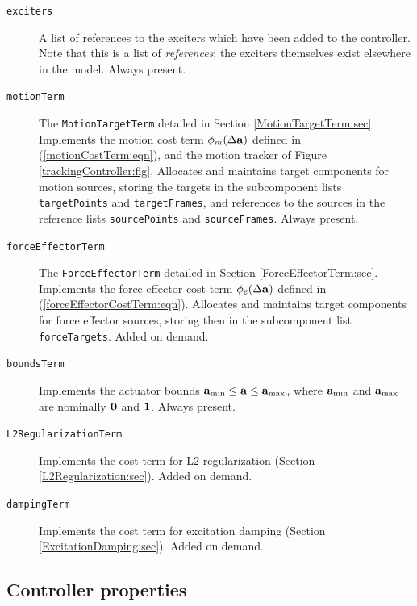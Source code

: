 \begin{description}

\item[\tt exciters]\mbox{}

A list of references to the exciters which have been added to the controller.
Note that this is a list of {\it references}; the exciters themselves exist
elsewhere in the model. Always present.

\item[\tt motionTerm]\mbox{}

The {\tt MotionTargetTerm} detailed in Section \ref{MotionTargetTerm:sec}.
Implements the motion cost term $\phi_m(\Delta{\bf a})$ defined in
(\ref{motionCostTerm:eqn}), and the motion tracker of
Figure \ref{trackingController:fig}.  Allocates and maintains target components
for motion sources, storing the targets in the subcomponent lists {\tt
targetPoints} and {\tt targetFrames}, and references to the sources in the
reference lists {\tt sourcePoints} and {\tt sourceFrames}. Always present.

\item[\tt forceEffectorTerm]\mbox{}

The {\tt ForceEffectorTerm} detailed in Section \ref{ForceEffectorTerm:sec}.
Implements the force effector cost term $\phi_e(\Delta{\bf a})$ defined in
(\ref{forceEffectorCostTerm:eqn}).  Allocates and maintains target components
for force effector sources, storing then in the subcomponent list {\tt
forceTargets}. Added on demand.

\item[\tt boundsTerm]\mbox{}

Implements the actuator bounds ${\bf a}_\text{min} \le {\bf a} \le {\bf a}_\text{max}$,
where ${\bf a}_\text{min}$ and ${\bf a}_\text{max}$ are nominally $\bf 0$
and $\bf 1$. Always present.

\item[\tt L2RegularizationTerm]\mbox{}

Implements the cost term for L2 regularization
(Section \ref{L2Regularization:sec}). Added on demand.

\item[\tt dampingTerm]\mbox{}

Implements the cost term for excitation damping
(Section \ref{ExcitationDamping:sec}). Added on demand.

\end{description}

\subsection{Controller properties}
\label{ControllerProperties:sec}

